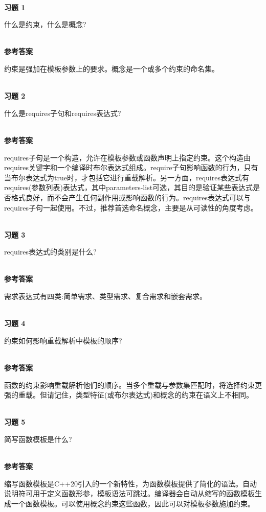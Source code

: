 \hspace*{\fill} \\ %
\noindent
\textbf{习题 1}

什么是约束，什么是概念?

\hspace*{\fill} \\ %
\noindent
\textbf{参考答案}

约束是强加在模板参数上的要求。概念是一个或多个约束的命名集。


\hspace*{\fill} \\ %
\noindent
\textbf{习题 2}

什么是requires子句和requires表达式?

\hspace*{\fill} \\ %
\noindent
\textbf{参考答案}

requires子句是一个构造，允许在模板参数或函数声明上指定约束。这个构造由requires关键字和一个编译时布尔表达式组成。require子句影响函数的行为，只有当布尔表达式为true时，才包括它进行重载解析。另一方面，requires表达式有requires(参数列表)表达式，其中parameters-list可选，其目的是验证某些表达式是否格式良好，而不会产生任何副作用或影响函数的行为。requires表达式可以与requires子句一起使用。不过，推荐首选命名概念，主要是从可读性的角度考虑。

\hspace*{\fill} \\ %
\noindent
\textbf{习题 3}

requires表达式的类别是什么?

\hspace*{\fill} \\ %
\noindent
\textbf{参考答案}

需求表达式有四类:简单需求、类型需求、复合需求和嵌套需求。

\hspace*{\fill} \\ %
\noindent
\textbf{习题 4}

约束如何影响重载解析中模板的顺序?

\hspace*{\fill} \\ %
\noindent
\textbf{参考答案}

函数的约束影响重载解析他们的顺序。当多个重载与参数集匹配时，将选择约束更强的重载。但请记住，类型特征(或布尔表达式)和概念的约束在语义上不相同。

\hspace*{\fill} \\ %
\noindent
\textbf{习题 5}

简写函数模板是什么?

\hspace*{\fill} \\ %
\noindent
\textbf{参考答案}

缩写函数模板是C++20引入的一个新特性，为函数模板提供了简化的语法。自动说明符可用于定义函数形参，模板语法可跳过。编译器会自动从缩写的函数模板生成一个函数模板。可以使用概念约束这些函数，因此可以对模板参数施加约束。












